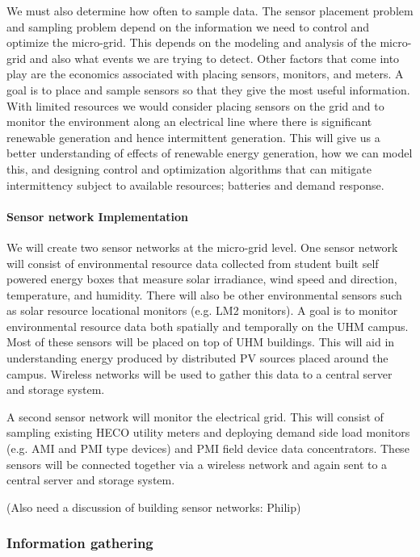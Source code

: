 We must also determine how often to sample data.    The sensor placement problem and sampling 
problem depend on the information we need to control and optimize the micro-grid.  This
depends on the modeling and analysis of the micro-grid and also what events we are trying
to detect.  Other factors that come into play are the economics associated with placing sensors,
monitors, and meters.  A goal is to place and sample sensors so that they give the most
useful information.    With limited resources we would consider placing sensors on the
grid and to monitor the environment along an electrical line where there is significant
renewable generation and hence intermittent generation.  This will give us a better understanding
of effects of renewable energy generation, how we can model this, and designing control
and optimization algorithms that can mitigate intermittency subject to available resources;
batteries and demand response.

 
\paragraph{Sensor network Implementation}

We will create two sensor networks at the micro-grid level.  One sensor
network will consist of environmental resource data collected from student
built self powered energy boxes that measure solar irradiance, wind speed
and direction, temperature, and humidity.  There will also be other
environmental sensors such as solar resource locational monitors (e.g. LM2
monitors).  A goal is to monitor environmental resource data both spatially
and temporally on the UHM campus.  Most of these sensors will be placed on
top of UHM buildings.  This will aid in understanding energy produced by
distributed PV sources placed around the campus.  Wireless networks will be
used to gather this data to a central server and storage system.

A second sensor network will monitor the electrical grid.  This will
consist of sampling existing HECO utility meters and deploying demand side
load monitors (e.g.  AMI and PMI type devices) and PMI field device data
concentrators.  These sensors will be connected together via a wireless
network and again sent to a central server and storage system.

(Also need a discussion of building sensor networks: Philip)

\subsubsection{Information gathering}

